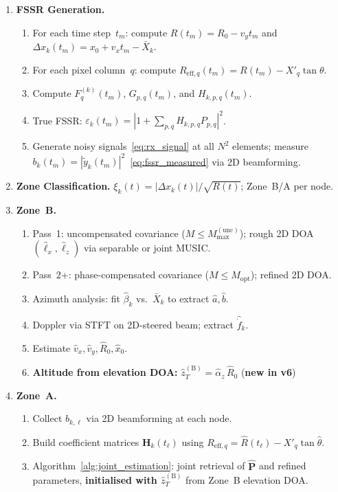 \documentclass[11pt,a4paper]{article}
\begin{document}
\begin{enumerate}
  \item \textbf{FSSR Generation.}
    \begin{enumerate}
      \item For each time step~$t_m$: compute $R(t_m)=R_0-v_y t_m$
        and $\Delta x_k(t_m)=x_0+v_x t_m-\bar{X}_k$.
      \item For each pixel column~$q$: compute
        $R_{\mathrm{eff},q}(t_m)=R(t_m)-X'_q\tan\theta$.
      \item Compute $F_q^{(k)}(t_m)$, $G_{p,q}(t_m)$, and
        $H_{k,p,q}(t_m)$.
      \item True FSSR: $\varepsilon_k(t_m)=|1+\sum_{p,q}
        H_{k,p,q}P_{p,q}|^2$.
      \item Generate noisy signals~\eqref{eq:rx_signal} at all $N^2$
        elements; measure
        $b_k(t_m)=|\tilde{y}_k(t_m)|^2$~\eqref{eq:fssr_measured}
        via 2D beamforming.
    \end{enumerate}

  \item \textbf{Zone Classification.}
    $\xi_k(t)=|\Delta x_k(t)|/\sqrt{R(t)}$; Zone~B/A per node.

  \item \textbf{Zone~B.}
    \begin{enumerate}
      \item Pass~1: uncompensated covariance ($M\le
        M_{\max}^{(\mathrm{unc})}$); rough 2D DOA
        $(\hat{\ell}_x,\hat{\ell}_z)$ via separable or joint MUSIC.
      \item Pass~2+: phase-compensated covariance ($M\le
        M_{\mathrm{opt}}$); refined 2D DOA.
      \item Azimuth analysis: fit $\hat{\beta}_k$ vs.\ $\bar{X}_k$
        to extract $\hat{a},\hat{b}$.
      \item Doppler via STFT on 2D-steered beam; extract
        $\hat{\dot{f}}_k$.
      \item Estimate $\hat{v}_x,\hat{v}_y,\hat{R}_0,\hat{x}_0$.
      \item \textbf{Altitude from elevation DOA:}
        $\hat{z}_T^{(\mathrm{B})}=\hat{\alpha}_z\,\hat{R}_0$
        \hfill(\textbf{new in v6})
    \end{enumerate}

  \item \textbf{Zone~A.}
    \begin{enumerate}
      \item Collect $b_{k,\ell}$ via 2D beamforming at each node.
      \item Build coefficient matrices $\mathbf{H}_k(t_\ell)$ using
        $R_{\mathrm{eff},q}=\hat{R}(t_\ell)-X'_q\tan\hat{\theta}$.
      \item Algorithm~\ref{alg:joint_estimation}: joint retrieval of
        $\hat{\mathbf{P}}$ and refined parameters, \textbf{initialised
        with $\hat{z}_T^{(\mathrm{B})}$} from Zone~B elevation DOA.
    \end{enumerate}


\end{enumerate}
\end{document}
